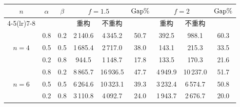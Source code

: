 \documentclass{ctacn}%
\begin{document}
\begin{center}
	\label{tab:1}
	\renewcommand\tabcolsep{10.6pt}%
	\begin{tabular}
{ccccccccc}\toprule
		\multirow{2}{*}[-2pt]{$n$}&\multirow{2}{*}[-2pt]{$\alpha$} &\multirow{2}{*}[-2pt]{$\beta$}&\multicolumn{2}{c}{$f=1.5$} &\multirow{2}{*}[-2pt]{${\rm{Gap}}\%$}&\multicolumn{2}{c}{\multirow{1}{*}{$f=2$}} &\multirow{2}{*}[-2pt]{${\rm{Gap}}\%$}\\
		\cmidrule(lr){4-5}\cmidrule(lr){7-8}
		&&&重构&不重构&&重构&不重构\\\midrule
		&0.8&0.2&2\,140.6&4\,345.2&50.7&392.5&988.1&60.3\\
		$n=4$&0.5&0.5&1\,685.4&2\,717.0&38.0&143.1&215.3&33.5\\
		&0.2&0.8&944.5&1\,148.7&17.8&133.5&170.3&21.6\\\midrule
		&0.8&0.2&8\,865.7&16\,936.5&47.7&4\,949.9&10\,237.0&51.7 \\
		$n=6$&0.5&0.5&6\,264.6&10\,323.1&39.3&3\,232.4&6\,574.7&50.8\\
		&0.2&0.8&3\,110.8&4\,092.7&24.0&1\,943.7&2\,676.7&20.0\\
		\bottomrule
\end{tabular}\end{center}
\end{document}
